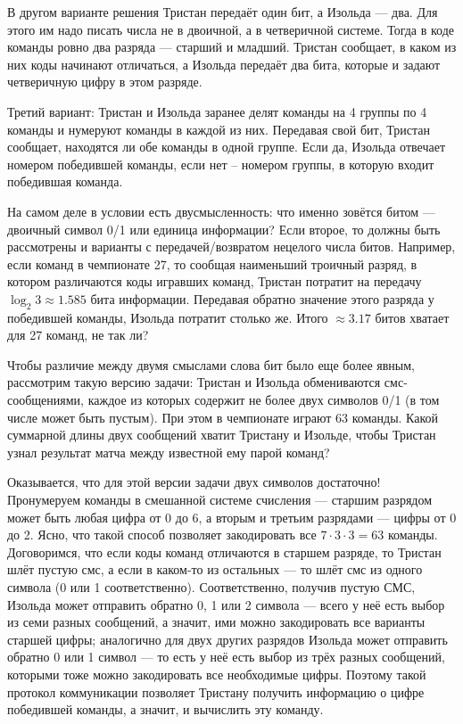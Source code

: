 \begin{addedbytheeditors}
В другом варианте решения Тристан передаёт один бит, а Изольда --- два.
Для этого им надо писать числа не в двоичной, а в четверичной системе.
Тогда в коде команды ровно два разряда --- старший и младший.
Тристан сообщает, в каком из них коды начинают отличаться, а Изольда передаёт два бита, которые и задают четверичную цифру в этом разряде.

Третий вариант: Тристан и Изольда заранее делят команды на 4 группы по 4 команды и нумеруют команды в каждой из них. Передавая свой бит, Тристан сообщает, находятся ли обе команды в одной группе. Если да, Изольда отвечает номером победившей команды, если нет -- номером группы, в которую входит победившая команда.

На самом деле в условии есть двусмысленность: что именно зовётся битом --- двоичный символ 0/1 или единица информации? Если второе, то должны быть рассмотрены и варианты с передачей/возвратом нецелого числа битов. Например, если команд в чемпионате 27, то сообщая наименьший троичный разряд, в котором различаются коды игравших команд, Тристан потратит на передачу $\log_2{3}\approx1.585$ бита информации. Передавая обратно значение этого разряда у победившей команды, Изольда потратит столько же. Итого $\approx3.17$ битов хватает для 27 команд, не так ли?

Чтобы различие между двумя смыслами слова бит было еще более явным, рассмотрим такую версию задачи: Тристан и Изольда обмениваются смс-сообщениями, каждое из которых содержит не более двух символов 0/1 (в том числе может быть пустым). При этом в чемпионате играют 63 команды. Какой суммарной длины двух сообщений хватит Тристану и Изольде, чтобы Тристан узнал результат матча между известной ему парой команд? 

Оказывается, что для этой версии задачи двух символов достаточно! Пронумеруем команды в смешанной системе счисления --- старшим разрядом может быть любая цифра от 0 до 6, а вторым и третьим разрядами --- цифры от 0 до 2. Ясно, что такой способ позволяет закодировать все $7\cdot3\cdot3=63$ команды. Договоримся, что если коды команд отличаются в старшем разряде, то Тристан шлёт пустую смс, а если в каком-то из остальных --- то шлёт смс из одного символа (0 или 1 соответственно). Соответственно, получив пустую СМС, Изольда может отправить обратно 0, 1 или 2 символа  --- всего у неё есть выбор из семи разных сообщений, а значит, ими можно закодировать все варианты старшей цифры; аналогично для двух других разрядов Изольда может отправить обратно 0 или 1 символ --- то есть у неё есть выбор из трёх разных сообщений, которыми тоже можно закодировать все необходимые цифры. Поэтому такой протокол коммуникации позволяет Тристану получить информацию о цифре победившей команды, а значит, и вычислить эту команду. 


\end{addedbytheeditors}
